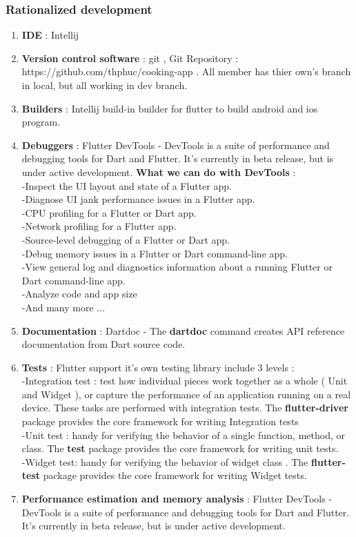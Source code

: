 \documentclass{article}
\begin{document}
\subsubsection{Rationalized development}
\begin{enumerate}

\item \textbf{IDE} : Intellij 
\item \textbf{Version control software}  : git , Git Repository : https://github.com/thphuc/cooking-app  . All member has thier own's branch in local, but all working in dev branch.
\item \textbf{Builders} : Intellij build-in builder for flutter to build android and ios program.
\item \textbf{Debuggers} : Flutter DevTools - DevTools is a suite of performance and debugging tools for Dart and Flutter. It’s currently in beta release, but is under active development.\textbf{ What we can do with DevTools } : \\
-Inspect the UI layout and state of a Flutter app. \\
-Diagnose UI jank performance issues in a Flutter app. \\
-CPU profiling for a Flutter or Dart app. \\
-Network profiling for a Flutter app. \\
-Source-level debugging of a Flutter or Dart app. \\
-Debug memory issues in a Flutter or Dart command-line app. \\
-View general log and diagnostics information about a running Flutter or Dart command-line app. \\
-Analyze code and app size \\
-And many more ... \\
\item \textbf{Documentation} : Dartdoc - The \textbf{dartdoc} command creates API reference documentation from Dart source code.
\item \textbf{Tests} : Flutter support it's own testing library include 3 levels :  \\
 -Integration test : test how individual pieces work together as a whole ( Unit and Widget ), or capture the performance of an application running on a real device. These tasks are performed with integration tests.  The \textbf{flutter-driver} package provides the core framework for writing Integration tests \\
 -Unit test :  handy for verifying the behavior of a single function, method, or class. The \textbf{test} package provides the core framework for writing unit tests. \\
 -Widget test: handy for verifying the behavior of widget class . The \textbf{flutter-test} package provides the core framework for writing Widget tests. \\
        
\item \textbf{Performance estimation and memory analysis} : Flutter DevTools - DevTools is a suite of performance and debugging tools for Dart and Flutter. It’s currently in beta release, but is under active development.
\end{enumerate}
\end{document}
